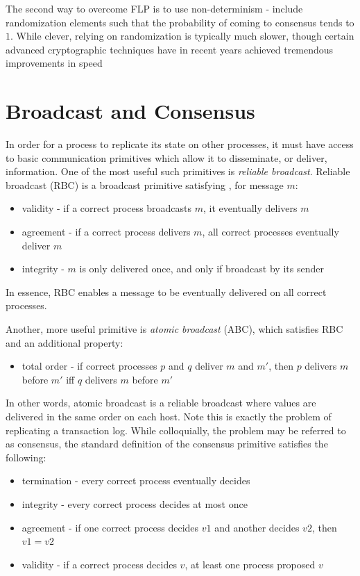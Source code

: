 The second way to overcome FLP is to use non-determinism - 
include randomization elements such that
the probability of coming to consensus tends to $1$.
While clever, relying on randomization is typically much slower, 
though certain advanced cryptographic techniques have in recent years
achieved tremendous improvements in speed \cite{honeybadger}


\section{Broadcast and Consensus}

In order for a process to replicate its state on other processes, 
it must have access to basic communication primitives which allow it to disseminate, or deliver, information.
One of the most useful such primitives is \emph{reliable broadcast}.
Reliable broadcast (RBC) is a broadcast primitive satisfying \cite{rbc}, for message $m$:

\begin{itemize}
\item validity - if a correct process broadcasts $m$, it eventually delivers $m$
\item agreement - if a correct process delivers $m$, all correct processes eventually deliver $m$
\item integrity - $m$ is only delivered once, and only if broadcast by its sender
\end{itemize}

In essence, RBC enables a message to be eventually delivered on all correct processes.

Another, more useful primitive is \emph{atomic broadcast} (ABC), 
which satisfies RBC and an additional property:

\begin{itemize}
\item total order - if correct processes $p$ and $q$ deliver $m$ and $m'$, then $p$ delivers $m$ before $m'$ iff $q$ delivers $m$ before $m'$
\end{itemize}

In other words, atomic broadcast is a reliable broadcast where values are delivered in the same order on each host. 
Note this is exactly the problem of replicating a transaction log.
While colloquially, the problem may be referred to as consensus, 
the standard definition of the consensus primitive satisfies the following:
\begin{itemize}
\item termination - every correct process eventually decides
\item integrity - every correct process decides at most once
\item agreement - if one correct process decides $v1$ and another decides $v2$, then $v1=v2$
\item validity - if a correct process decides $v$, at least one process proposed $v$
\end{itemize}

